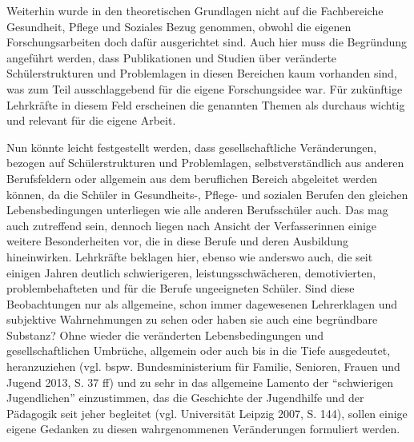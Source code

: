 Weiterhin wurde in den theoretischen Grundlagen nicht auf die Fachbereiche Gesundheit, Pflege und Soziales Bezug genommen, obwohl die eigenen Forschungsarbeiten doch dafür ausgerichtet sind. Auch hier muss die Begründung angeführt werden, dass Publikationen und Studien über veränderte Schülerstrukturen und Problemlagen in diesen Bereichen kaum vorhanden sind, was zum Teil ausschlaggebend für die eigene Forschungsidee war. Für zukünftige Lehrkräfte in diesem Feld erscheinen die genannten Themen als durchaus wichtig und relevant für die eigene Arbeit.

Nun könnte leicht festgestellt werden, dass gesellschaftliche Veränderungen, bezogen auf Schülerstrukturen und Problemlagen, selbstverständlich aus anderen Berufsfeldern oder allgemein aus dem beruflichen Bereich abgeleitet werden können, da die Schüler in Gesundheits-, Pflege- und sozialen Berufen den gleichen Lebensbedingungen unterliegen wie alle anderen Berufsschüler auch. Das mag auch zutreffend sein, dennoch liegen nach Ansicht der Verfasserinnen einige weitere Besonderheiten vor, die in diese Berufe und deren Ausbildung hineinwirken. Lehrkräfte beklagen hier, ebenso wie anderswo auch, die seit einigen Jahren deutlich schwierigeren, leistungsschwächeren, demotivierten, problembehafteten und für die Berufe ungeeigneten Schüler. Sind diese Beobachtungen nur als allgemeine, schon immer dagewesenen Lehrerklagen und subjektive Wahrnehmungen zu sehen oder haben sie auch eine begründbare Substanz? Ohne wieder die veränderten Lebensbedingungen und gesellschaftlichen Umbrüche, allgemein oder auch bis in die Tiefe ausgedeutet, heranzuziehen (vgl. bspw. Bundesministerium für Familie, Senioren, Frauen und Jugend 2013, S. 37 ff) und zu sehr in das allgemeine Lamento der "`schwierigen Jugendlichen"' einzustimmen, das die Geschichte der Jugendhilfe und der Pädagogik seit jeher begleitet (vgl. Universität Leipzig 2007, S. 144), sollen einige eigene Gedanken zu diesen wahrgenommenen Veränderungen formuliert werden. 

